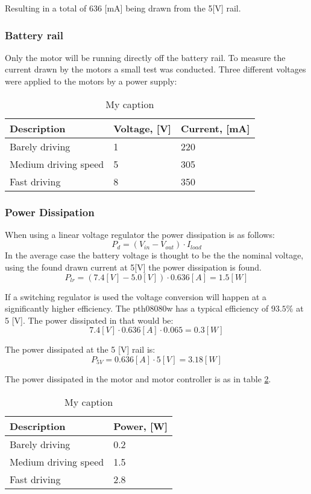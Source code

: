 \documentclass[11pt]{article}
\begin{document}
Resulting in a total of $636$ [mA] being drawn from the 5[V] rail.

\subsubsection{Battery rail} %

Only the motor will be running directly off the battery rail.
To measure the current drawn by the motors a small test was conducted. 
Three different voltages were applied to the motors by a power supply:

\begin{table}[]
\centering
\caption{My caption}
\label{my-label}
\begin{tabular}{|l|l|l|}
\hline
\textbf{Description} & Voltage, [V]   & Current, [mA]      \\ \hline
Barely driving       & 1  & 220  \\ \hline
Medium driving speed & 5  & 305  \\ \hline
Fast driving         & 8  & 350  \\ \hline
\end{tabular}
\end{table}


\subsubsection{Power Dissipation} %
When using a linear voltage regulator the power dissipation is as follows:
$$P_d = (V_{in} - V_{out}) \cdot I_{load}$$
In the average case the battery voltage is thought to be the the nominal voltage, using the found drawn current at 5[V] the power dissipation is found.
$$P_{lr} = (7.4 [V] - 5.0 [V]) \cdot 0.636 [A] = 1.5 [W]$$

If a switching regulator is used the voltage conversion will happen at a significantly higher efficiency.
The pth08080w has a typical efficiency of $93.5\%$ at 5 [V].
The power dissipated in that would be: 
$$7.4 [V] \cdot 0.636 [A] \cdot 0.065 = 0.3 [W]$$


The power dissipated at the 5 [V] rail is: 
$$P_{5V} = 0.636 [A] \cdot 5 [V] = 3.18 [W]$$

The power dissipated in the motor and motor controller is as in table \ref{tab:power_motor}.

\begin{table}[H]
\centering
\caption{My caption}
\label{tab:power_motor}
\begin{tabular}{|l|l|}
\hline
\textbf{Description} & Power, [W]     \\ \hline
Barely driving       & 0.2 \\ \hline
Medium driving speed & 1.5 \\ \hline
Fast driving         & 2.8 \\ \hline
\end{tabular}
\end{table}
\end{document}
